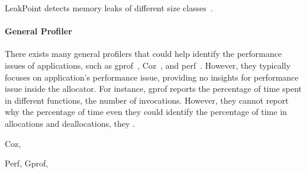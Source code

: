 LeakPoint detects memory leaks of different size classes~\cite{Clause:2010:LPC:1806799.1806874}.

\paragraph{General Profiler} There exists many general profilers that could help identify the performance issues of applications, such as  gprof~\cite{DBLP:conf/sigplan/GrahamKM82}, Coz~\cite{Coz}, and perf~\cite{perf}. However, they typically focuses on application's performance issue, providing no insights for performance issue inside the allocator. For instance, gprof  reports the percentage of time spent in different functions, the number of invocations. However, they cannot report why the percentage of time   
even they could identify the percentage of time in allocations and deallocations, they . 

Coz, 

Perf, 
Gprof,

